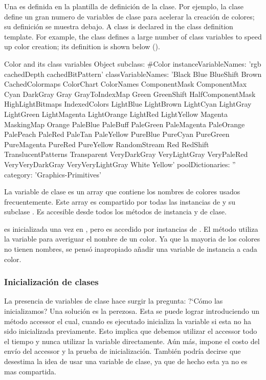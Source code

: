 \documentclass[a4paper,10pt,twoside]{book}
\begin{document}
Una  es definida en la plantilla de definici\'on de la clase. Por ejemplo, la clase  define un gran numero de variables de clase para acelerar la creaci\'on de colores; su definici\'on se muestra debajo.
A class  is declared in the class definition template.
For example, the class  defines a large number of class variables to speed up color creation; its definition is shown below ().
\begin{classdef}[Color]{Color and its class variables}
Object subclass: #Color 	
        instanceVariableNames: 'rgb cachedDepth cachedBitPattern'
        classVariableNames: 'Black Blue BlueShift Brown CachedColormaps ColorChart ColorNames ComponentMask ComponentMax Cyan DarkGray Gray GrayToIndexMap Green GreenShift HalfComponentMask HighLightBitmaps IndexedColors LightBlue LightBrown LightCyan LightGray LightGreen LightMagenta LightOrange LightRed LightYellow Magenta MaskingMap Orange PaleBlue PaleBuff PaleGreen PaleMagenta PaleOrange PalePeach PaleRed PaleTan PaleYellow PureBlue PureCyan PureGreen PureMagenta PureRed PureYellow RandomStream Red RedShift TranslucentPatterns Transparent VeryDarkGray VeryLightGray VeryPaleRed VeryVeryDarkGray VeryVeryLightGray White Yellow'
        poolDictionaries: '' 	
        category: 'Graphics-Primitives'
\end{classdef}

La variable de clase  es un array que contiene los nombres de colores usados frecuentemente. Este array es compartido por todas las instancias de  y su subclase . Es accesible desde todos los m\'etodos de instancia y de clase.

 es inicializada una vez en , pero es accedido por instancias de .
El m\'etodo  utiliza la variable para averiguar el nombre de un color.
Ya que la mayoria de los colores no tienen nombres, se pens\'o inapropiado a\~nadir una variable de instancia  a cada color.

\subsubsection{Inicializaci\'on de clases}

La presencia de variables de clase hace surgir la pregunta: ?`C\'omo las inicializamos? Una soluci\'on es la  perezosa. Esta se puede lograr introduciendo un m\'etodo accessor el cual, cuando  es ejecutado inicializa la variable si esta no ha sido inicializada previamente. Esto implica que debemos utilizar el accessor todo el tiempo y nunca utilizar la variable directamente.
A\'un m\'as, impone el costo del env\'io del accessor y la prueba de inicializaci\'on.
Tambi\'en podr\'ia decirse que desestima la idea de usar una variable de clase, ya que de hecho esta ya no es mas compartida.
\end{document}
